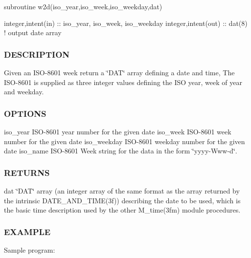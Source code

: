 \begin{DoxyVerb}subroutine w2d(iso_year,iso_week,iso_weekday,dat)

 integer,intent(in)      :: iso_year, iso_week, iso_weekday
 integer,intent(out)     :: dat(8)     ! output date array
\end{DoxyVerb}


\subsubsection*{D\+E\+S\+C\+R\+I\+P\+T\+I\+ON}

Given an I\+S\+O-\/8601 week return a \char`\"{}\+D\+A\+T\char`\"{} array defining a date and time, The I\+S\+O-\/8601 is supplied as three integer values defining the I\+SO year, week of year and weekday.

\subsubsection*{O\+P\+T\+I\+O\+NS}

iso\+\_\+year I\+S\+O-\/8601 year number for the given date iso\+\_\+week I\+S\+O-\/8601 week number for the given date iso\+\_\+weekday I\+S\+O-\/8601 weekday number for the given date iso\+\_\+name I\+S\+O-\/8601 Week string for the data in the form \char`\"{}yyyy-\/\+Www-\/d\char`\"{}.

\subsubsection*{R\+E\+T\+U\+R\+NS}

dat \char`\"{}\+D\+A\+T\char`\"{} array (an integer array of the same format as the array returned by the intrinsic D\+A\+T\+E\+\_\+\+A\+N\+D\+\_\+\+T\+I\+M\+E(3f)) describing the date to be used, which is the basic time description used by the other M\+\_\+time(3fm) module procedures.

\subsubsection*{E\+X\+A\+M\+P\+LE}

Sample program\+:

